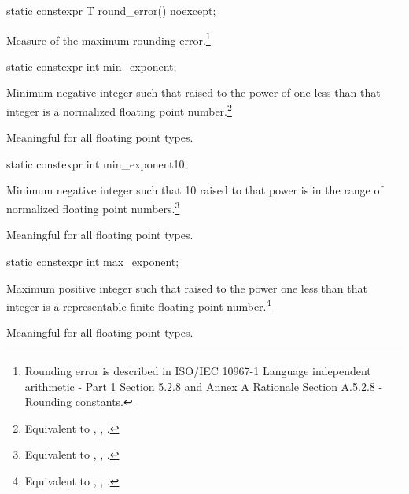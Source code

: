 \begin{itemdecl}
static constexpr T round_error() noexcept;
\end{itemdecl}

\begin{itemdescr}
\pnum
Measure of the maximum rounding error.\footnote{Rounding error is described in
ISO/IEC 10967-1 Language independent arithmetic - Part 1
Section 5.2.8 and
Annex A Rationale Section A.5.2.8 - Rounding constants.}
\end{itemdescr}

\begin{itemdecl}
static constexpr int  min_exponent;
\end{itemdecl}

\begin{itemdescr}
\pnum
Minimum negative integer such that
raised to the power of one less than that integer is a normalized floating
point number.\footnote{Equivalent to , ,
.}

\pnum
Meaningful for all floating point types.
\end{itemdescr}

\begin{itemdecl}
static constexpr int  min_exponent10;
\end{itemdecl}

\begin{itemdescr}
\pnum
Minimum negative integer such that 10 raised to that power is in the range
of normalized floating point numbers.\footnote{Equivalent to
, , .}

\pnum
Meaningful for all floating point types.
\end{itemdescr}

\begin{itemdecl}
static constexpr int  max_exponent;
\end{itemdecl}

\begin{itemdescr}
\pnum
Maximum positive integer such that
raised to the power one less than that integer is a representable finite
floating point number.\footnote{Equivalent to ,
, .}

\pnum
Meaningful for all floating point types.
\end{itemdescr}

